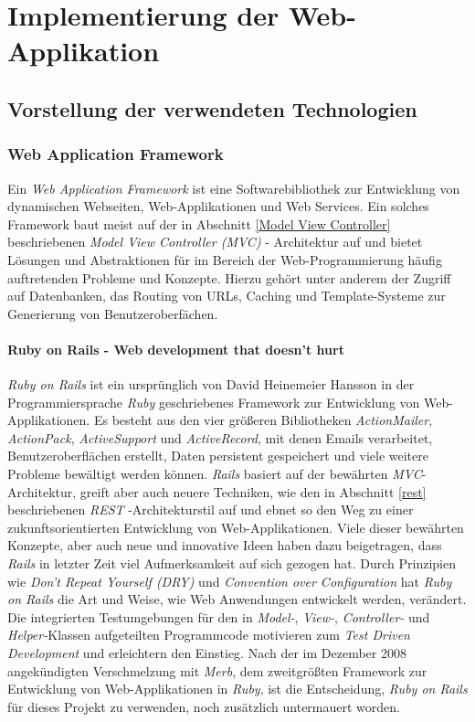 \chapter{Implementierung der Web-Applikation}

\section{Vorstellung der verwendeten \nohyphens{Technologien}}

\subsection{Web Application Framework}

Ein \textit{Web Application Framework} ist eine Softwarebibliothek zur
Entwicklung von dynamischen Webseiten, Web-Applikationen und Web
Services. Ein solches Framework baut meist auf der in Abschnitt
\ref{Model View Controller} beschriebenen \textit{Model View
  Controller (MVC)}  -
Architektur auf und bietet Lösungen und Abstraktionen für im Bereich
der Web-Programmierung häufig auftretenden Probleme und
Konzepte. Hierzu gehört unter anderem der Zugriff auf Datenbanken, das
Routing von URLs, Caching und Template-Systeme zur Generierung von
Benutzeroberfächen.

\subsubsection{Ruby on Rails - Web development that doesn't hurt}

\textit{Ruby on Rails} ist ein ursprünglich von David Heinemeier
Hansson in der Programmiersprache \textit{Ruby} geschriebenes
Framework zur Entwicklung von Web-Applikationen. Es besteht aus den
vier größeren Bibliotheken \textit{ActionMailer}, \textit{ActionPack},
\textit{ActiveSupport} und \textit{ActiveRecord}, mit denen Emails
verarbeitet, Benutzeroberflächen erstellt, Daten persistent
gespeichert und viele weitere Probleme bewältigt werden
können. \textit{Rails} basiert auf der bewährten
\textit{MVC}-Architektur, greift aber auch neuere Techniken, wie den
in Abschnitt \ref{rest} beschriebenen \textit{REST}
-Architekturstil
auf und ebnet so den Weg zu einer zukunftsorientierten Entwicklung von
Web-Applikationen. Viele dieser bewährten Konzepte, aber auch neue und
innovative Ideen haben dazu beigetragen, dass \textit{Rails} in
letzter Zeit viel Aufmerksamkeit auf sich gezogen hat. Durch
Prinzipien wie \textit{Don't Repeat Yourself (DRY)}
 und \textit{Convention over
  Configuration} hat \textit{Ruby on Rails} die Art und Weise, wie Web
Anwendungen entwickelt werden, verändert. Die integrierten
Testumgebungen für den in \textit{Model-}, \textit{View-},
\textit{Controller-} und \textit{Helper-}Klassen aufgeteilten
Programmcode motivieren zum \textit{Test Driven Development} und
erleichtern den Einstieg.  Nach der im Dezember 2008 angekündigten
Verschmelzung mit \textit{Merb}, dem zweitgrößten Framework zur
Entwicklung von Web-Applikationen in \textit{Ruby}, ist die
Entscheidung, \textit{Ruby on Rails} für dieses Projekt zu verwenden,
noch zusätzlich untermauert worden.

